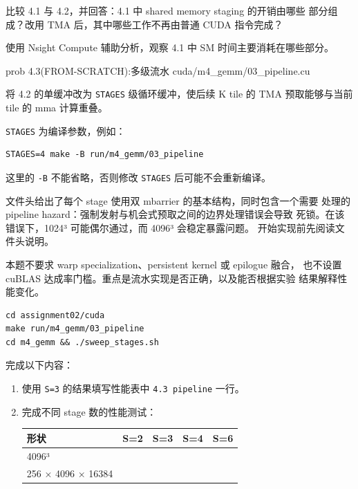 \documentclass[11pt,a4paper,fontset=none]{ctexart}
\providecommand{\passthrough}[1]{#1}
\begin{document}
比较 4.1 与 4.2，并回答：4.1 中 shared memory staging 的开销由哪些
部分组成？改用 TMA 后，其中哪些工作不再由普通 CUDA 指令完成？

使用 Nsight Compute 辅助分析，观察 4.1 中 SM 时间主要消耗在哪些部分。

\begin{capstone}{prob 4.3(FROM-SCRATCH):多级流水 \hfill {\footnotesize\ttfamily cuda/m4\_gemm/03\_pipeline.cu}}

将 4.2 的单缓冲改为 \passthrough{\lstinline!STAGES!} 级循环缓冲，使后续
K tile 的 TMA 预取能够与当前 tile 的 mma 计算重叠。

\passthrough{\lstinline!STAGES!} 为编译参数，例如：

\begin{lstlisting}
STAGES=4 make -B run/m4_gemm/03_pipeline
\end{lstlisting}

这里的 \passthrough{\lstinline!-B!} 不能省略，否则修改
\passthrough{\lstinline!STAGES!} 后可能不会重新编译。

文件头给出了每个 stage 使用双 mbarrier 的基本结构，同时包含一个需要
处理的 pipeline hazard：强制发射与机会式预取之间的边界处理错误会导致
死锁。在该错误下，1024³ 可能偶尔通过，而 4096³ 会稳定暴露问题。
开始实现前先阅读文件头说明。

本题不要求 warp specialization、persistent kernel 或 epilogue 融合，
也不设置 cuBLAS 达成率门槛。重点是流水实现是否正确，以及能否根据实验
结果解释性能变化。

\begin{lstlisting}
cd assignment02/cuda
make run/m4_gemm/03_pipeline
cd m4_gemm && ./sweep_stages.sh
\end{lstlisting}

完成以下内容：

\begin{enumerate}
\def\labelenumi{\arabic{enumi}.}
\item
  使用 \passthrough{\lstinline!S=3!} 的结果填写性能表中
  \passthrough{\lstinline!4.3 pipeline!} 一行。
\item
  完成不同 stage 数的性能测试：

  {\def\LTcaptype{none} %
  \begin{longtable}[]{@{}lllll@{}}
  \toprule\noalign{}
  形状 & S=2 & S=3 & S=4 & S=6 \\
  \midrule\noalign{}
  \endhead
  \bottomrule\noalign{}
  \endlastfoot
  4096³ & & & & \\
  256 × 4096 × 16384 & & & & \\
  \end{longtable}
  }


\end{enumerate}
\end{capstone}
\end{document}
